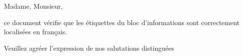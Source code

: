 \documentclass[modern, infoblock, lang=french]{../../onlinebrief24}
\begin{document}
\begin{letter}{}
\opening{Madame, Monsieur,}

ce document vérifie que les étiquettes du bloc d'informations sont
correctement localisées en français.

\closing{Veuillez agréer l'expression de nos salutations distinguées}
\end{letter}
\end{document}
